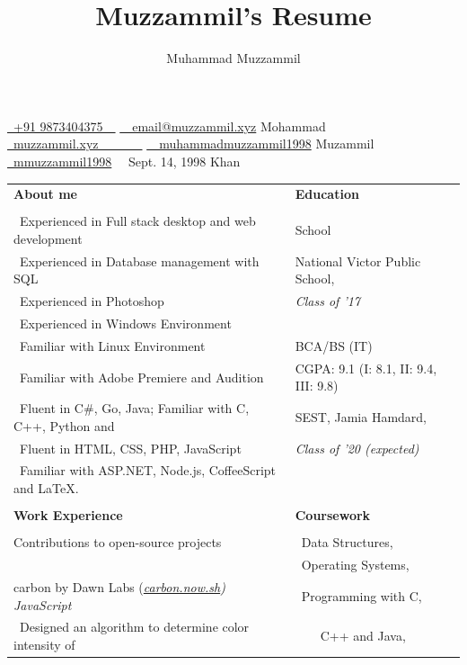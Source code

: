 \documentclass[12pt, a4paper]{article}
\title{Muzzammil's Resume}
\author{Muhammad Muzzammil}
\def\phone{{\FA \faPhone}}
\def\email{{\FA \faEnvelope0}}
\def\website{{\FA \faGlobe}}
\def\github{{\FA \faGithub}}
\def\twitter{{\FA \faTwitter}}
\def\bday{{\FA \faBirthdayCake}}
\def\p#1{\textbullet \ #1}
\def\heading#1{\Large \bfseries #1 \normalsize \normalfont }
\def\subheading#1{\large #1 \normalsize \dotfill}
\def\name#1{\Huge #1 \normalsize \\}
\def\httpslink#1{\href{https://#1}{#1}}
\def\gitlinkc#1#2{\href{https://github.com/#1}{#2}}
\def\gitlink#1{ \gitlinkc{#1}{\github}}
\def\projectlink#1{\itshape \httpslink{#1}\normalfont}
\def\lang#1{\hfill #1\normalfont}
\begin{document}
    \noindent
    \href{tel:+91 9873404375}{ \phone\ +91 9873404375\ \ }
    \href{mailto:email@muzzammil.xyz}{ \email \ \ email@muzzammil.xyz} 
    \hfill
    \name{Mohammad}
    \href{https://muzzammil.xyz}{ \website\ muzzammil.xyz\ \ \ \ \ \ \ }
    \href{https://git.muzzammil.xyz/?ref=resume}{ \github\ \ muhammadmuzzammil1998} 
    \hfill 
    \name{Muzammil}
    \href{https://twitter.com/mmuzzammil1998}{ \twitter\ mmuzzammil1998}
    { \bday\ \ Sept. 14, 1998}
    \hfill 
    \name{Khan}
    \begin{center}
        \dotfill
    \end{center}
    \noindent
    \begin{tabular}{l l}
        \heading{About me} & \heading{Education} \\
         &  \\
        \p{Experienced in Full stack desktop and web development} & \subheading{School} \\
        \p{Experienced in Database management with SQL} & National Victor Public School, \\
        \p{Experienced in Photoshop} & \itshape Class of '17 \\
        \p{Experienced in Windows Environment} &  \\
        \p{Familiar with Linux Environment} & \subheading{BCA/BS (IT)} \\
        \p{Familiar with Adobe Premiere and Audition} & CGPA: 9.1 (I: 8.1, II: 9.4, III: 9.8) \\
        \p{Fluent in C\#, Go, Java; Familiar with C, C++, Python and} & SEST, Jamia Hamdard, \\
        \p{Fluent in HTML, CSS, PHP, JavaScript} & \itshape Class of '20 (expected) \\
        \p{Familiar with ASP.NET, Node.js, CoffeeScript and \LaTeX.} &  \\
         &  \\
        \heading{Work Experience} & \heading{Coursework} \\
         &  \\
        \subheading{Contributions to open-source projects} & \p{Data Structures}, \\
         & \p{Operating Systems},  \\
        carbon by Dawn Labs (\projectlink{carbon.now.sh})\gitlink{muhammadmuzzammil1998?org=dawnlabs}\lang{JavaScript} & \p{Programming with C,} \\
        \p{Designed an algorithm to determine color intensity of} & \ \ \ \ C++ and Java,  \\

\end{tabular}
\end{document}
